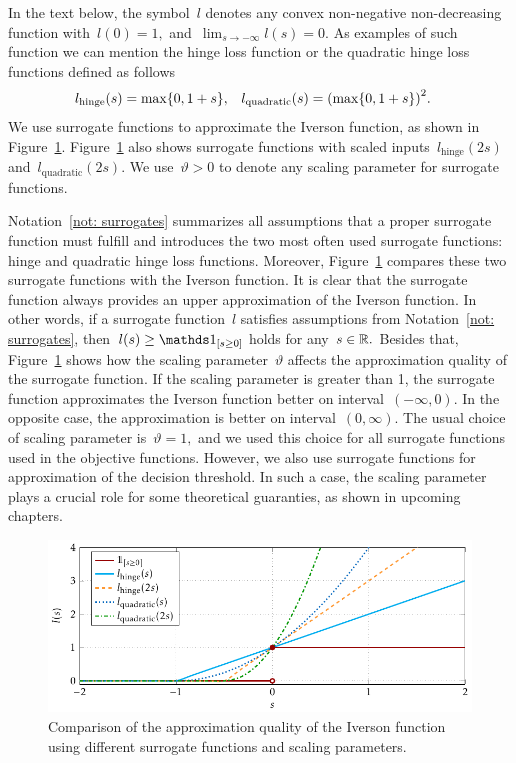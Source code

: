 \begin{notation}\label{not: surrogates}
  In the text below, the symbol~$l$ denotes any convex non-negative non-decreasing function with~$l(0) = 1,$ and~$\lim_{s \to -\infty} l(s) = 0.$ As examples of such function we can mention the hinge loss function or the quadratic hinge loss functions defined as follows
  \begin{align*}
    l_{\text{hinge}}(s) & = \max\Brac[c]{0, 1 + s}, &
    l_{\text{quadratic}}(s) & = \Brac{\max\Brac[c]{0, 1 + s}}^2.
  \end{align*}
  We use surrogate functions to approximate the Iverson function, as shown in Figure~\ref{fig: surrogates}. Figure~\ref{fig: surrogates} also shows surrogate functions with scaled inputs~$l_{\text{hinge}}(2s)$ and~$l_{\text{quadratic}}(2s).$ We use~$\vartheta > 0$ to denote any scaling parameter for surrogate functions.
\end{notation}

Notation~\ref{not: surrogates} summarizes all assumptions that a proper surrogate function must fulfill and introduces the two most often used surrogate functions: hinge and quadratic hinge loss functions. Moreover, Figure~\ref{fig: surrogates} compares these two surrogate functions with the Iverson function. It is clear that the surrogate function always provides  an upper approximation of the Iverson function. In other words, if a surrogate function~$l$ satisfies assumptions from Notation~\ref{not: surrogates}, then~$l(s) \geq \Iverson{s \geq 0}$ holds for any~$s \in \mathbb{R}.$ Besides that, Figure~\ref{fig: surrogates} shows how the scaling parameter~$\vartheta$ affects the approximation quality of the surrogate function. If the scaling parameter is greater than 1, the surrogate function approximates the Iverson function better on interval~$(-\infty, 0)$. In the opposite case, the approximation is better on interval~$(0, \infty)$. The usual choice of scaling parameter is~$\vartheta = 1,$ and we used this choice for all surrogate functions used in the objective functions. However, we also use surrogate functions for approximation of the decision threshold. In such a case, the scaling parameter plays a crucial role for some theoretical guaranties, as shown in upcoming chapters.

\begin{figure}[t]
  \centering
  \includegraphics[width = \linewidth]{images/surrogates.pdf}
  \caption{Comparison of the approximation quality of the Iverson function using different surrogate functions and scaling parameters.}
  \label{fig: surrogates}
\end{figure}


